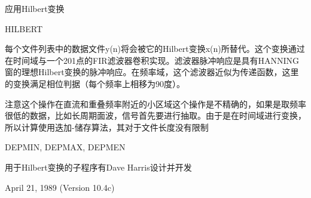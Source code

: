 \label{cmd:hilbert}

应用Hilbert变换

HILBERT

每个文件列表中的数据文件y(n)将会被它的Hilbert变换x(n)所替代。这个变换通过在时间域与一个201点的FIR滤波器卷积实现。滤波器脉冲响应是具有HANNING窗的理想Hilbert变换的脉冲响应。在频率域，这个滤波器近似为传递函数，这里的变换满足相位判据（每个频率上相移为90度）。

注意这个操作在直流和重叠频率附近的小区域这个操作是不精确的，如果是取频率很低的数据，比如长周期面波，信号首先要进行抽取。由于是在时间域进行变换，所以计算使用迭加-储存算法，其对于文件长度没有限制

DEPMIN, DEPMAX, DEPMEN

用于Hilbert变换的子程序有Dave Harris设计并开发

April 21, 1989 (Version 10.4c)
